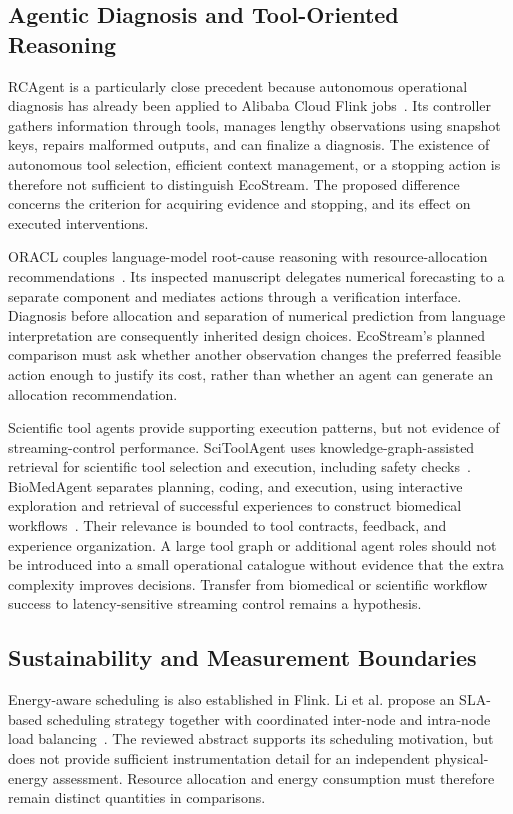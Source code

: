 \subsection{Agentic Diagnosis and Tool-Oriented Reasoning}
RCAgent is a particularly close precedent because autonomous operational diagnosis has already been applied to Alibaba Cloud Flink jobs~\cite{wang2024rcagent}. Its controller gathers information through tools, manages lengthy observations using snapshot keys, repairs malformed outputs, and can finalize a diagnosis. The existence of autonomous tool selection, efficient context management, or a stopping action is therefore not sufficient to distinguish EcoStream. The proposed difference concerns the criterion for acquiring evidence and stopping, and its effect on executed interventions.

ORACL couples language-model root-cause reasoning with resource-allocation recommendations~\cite{bai2026oracl}. Its inspected manuscript delegates numerical forecasting to a separate component and mediates actions through a verification interface. Diagnosis before allocation and separation of numerical prediction from language interpretation are consequently inherited design choices. EcoStream's planned comparison must ask whether another observation changes the preferred feasible action enough to justify its cost, rather than whether an agent can generate an allocation recommendation.

Scientific tool agents provide supporting execution patterns, but not evidence of streaming-control performance. SciToolAgent uses knowledge-graph-assisted retrieval for scientific tool selection and execution, including safety checks~\cite{ding2025scitoolagent}. BioMedAgent separates planning, coding, and execution, using interactive exploration and retrieval of successful experiences to construct biomedical workflows~\cite{bu2026biomedagent}. Their relevance is bounded to tool contracts, feedback, and experience organization. A large tool graph or additional agent roles should not be introduced into a small operational catalogue without evidence that the extra complexity improves decisions. Transfer from biomedical or scientific workflow success to latency-sensitive streaming control remains a hypothesis.

\subsection{Sustainability and Measurement Boundaries}
Energy-aware scheduling is also established in Flink. Li et al. propose an SLA-based scheduling strategy together with coordinated inter-node and intra-node load balancing~\cite{li2025energyflink}. The reviewed abstract supports its scheduling motivation, but does not provide sufficient instrumentation detail for an independent physical-energy assessment. Resource allocation and energy consumption must therefore remain distinct quantities in comparisons.

